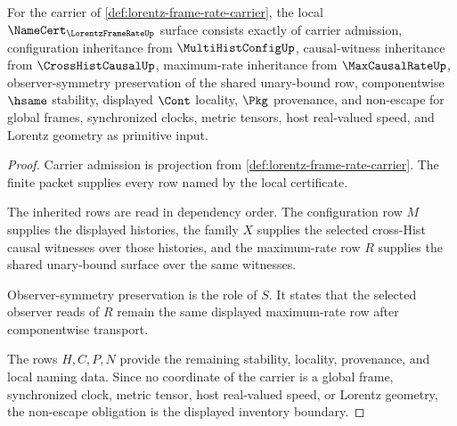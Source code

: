\begin{theorem}
\label{thm:lorentz-frame-rate-namecert-obligations}
For the carrier of \autoref{def:lorentz-frame-rate-carrier}, the local $\NameCert_{\LorentzFrameRateUp}$ surface consists exactly of carrier admission, configuration inheritance from $\MultiHistConfigUp$, causal-witness inheritance from $\CrossHistCausalUp$, maximum-rate inheritance from $\MaxCausalRateUp$, observer-symmetry preservation of the shared unary-bound row, componentwise $\hsame$ stability, displayed $\Cont$ locality, $\Pkg$ provenance, and non-escape for global frames, synchronized clocks, metric tensors, host real-valued speed, and Lorentz geometry as primitive input.
\end{theorem}
\begin{proof}
Carrier admission is projection from \autoref{def:lorentz-frame-rate-carrier}. The finite packet supplies every row named by the local certificate.

The inherited rows are read in dependency order. The configuration row $M$ supplies the displayed histories, the family $X$ supplies the selected cross-Hist causal witnesses over those histories, and the maximum-rate row $R$ supplies the shared unary-bound surface over the same witnesses.

Observer-symmetry preservation is the role of $S$. It states that the selected observer reads of $R$ remain the same displayed maximum-rate row after componentwise transport.

The rows $H,C,P,N$ provide the remaining stability, locality, provenance, and local naming data. Since no coordinate of the carrier is a global frame, synchronized clock, metric tensor, host real-valued speed, or Lorentz geometry, the non-escape obligation is the displayed inventory boundary.
\end{proof}


